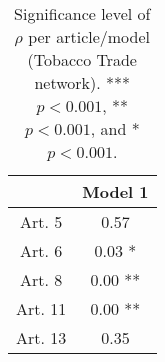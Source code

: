 \begin{table}[ht]
\centering
\begin{tabular}{cc}
  \toprule
 & Model 1 \\ 
  \midrule
Art. 5 & 0.57   \\ 
   \midrule
Art. 6 & 0.03 * \\ 
   \midrule
Art. 8 & 0.00 ** \\ 
   \midrule
Art. 11 & 0.00 ** \\ 
   \midrule
Art. 13 & 0.35   \\ 
   \bottomrule
\end{tabular}
\caption{Significance level of $\rho$ per article/model (Tobacco Trade network). *** $p < 0.001$, ** $p < 0.001$, and * $p < 0.001$.} 
\end{table}
